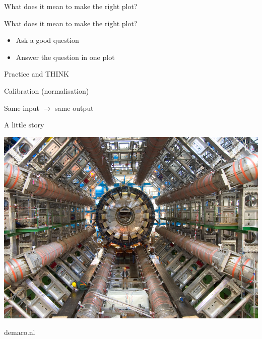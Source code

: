 \documentclass{beamer}
\begin{document}
\begin{frame}{What does it mean to make the right plot?}


\end{frame}


\begin{frame}{What does it mean to make the right plot?}

\begin{itemize}
\item Ask a good question
\item Answer the question in one plot
\end{itemize}

\end{frame}


\begin{frame}{Practice and THINK}

\end{frame}

\begin{frame}{Calibration (normalisation)}

Same input $\rightarrow$ same output


\end{frame}


\begin{frame}{A little story}

\begin{center}
\includegraphics[scale=0.4]{pics/wk2/cern_pic.jpg}
\end{center}

demaco.nl

\end{frame}
\end{document}

